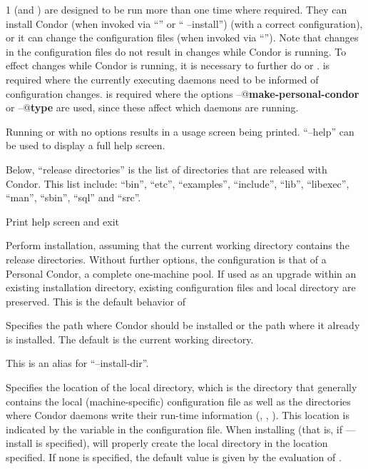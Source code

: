 \begin{ManPage}{\label{man-condor-configure}}{1}
 (and ) are designed to be run more
than one time where required.
They can install Condor (when invoked via ``'' or
`` --install'') (with a correct configuration),
or it can change the configuration files (when invoked via
``'').
Note that changes in the configuration files do not result
in changes while Condor is running.
To effect changes while Condor is running,
it is necessary to further do  or .
  is required where the currently executing
daemons need to be informed of configuration changes.
 is required where the options
\verb@--@\textbf{make-personal-condor} or
\verb@--@\textbf{type}
are used, since these affect which daemons are running.

Running  or  with no options results
in a usage screen being printed.  ``--help'' can be used to display a
full help screen.

Below, ``release directories'' is the list of directories that are
released with Condor.  This list include: 
``bin'', ``etc'', ``examples'', ``include'', ``lib'', ``libexec'',
``man'', ``sbin'', ``sql'' and ``src''.

\begin{Options}
	 {Print help screen and exit}

	 {Perform installation, assuming that
	the current working directory contains the release directories.
	Without further options, the configuration is that of
	a Personal Condor, a complete one-machine pool.
	If used as an 
	upgrade within an existing installation directory, existing 
	configuration files and local directory are preserved.  This
	is the default behavior of }

	 {Specifies the path
	where Condor should be installed or the path where it already is
	installed. The default is the current working directory.}

	 {This is an alias for
	``--install-dir''.}

	 {Specifies the
	location of the local directory, which is the directory that generally 
	contains the local (machine-specific) configuration file as well as the
	directories where Condor daemons write their run-time information 
	(, , ).
	This location is indicated  by the  
	variable in the configuration file. 
	When installing (that is, if ---install is specified),
	will properly create the local directory in the location specified.
	If none is specified, the default value is given by the evaluation of
        .

}
\end{Options}
\end{ManPage}
